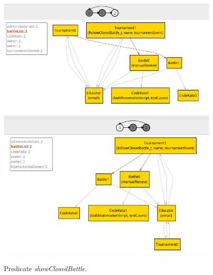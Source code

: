 \documentclass[../RASD.tex]{subfiles}
\begin{document}
\begin{figure}[h!]
    \centering
    \includegraphics[width=\textwidth]{../assets/section_4/showClosedBattle_0.png}
    \includegraphics[width=\textwidth]{../assets/section_4/showClosedBattle_1.png}
    \caption{Predicate \textit{showClosedBattle}.}
    \label{img:alloy_show_closed_battle}
\end{figure}
\end{document}
